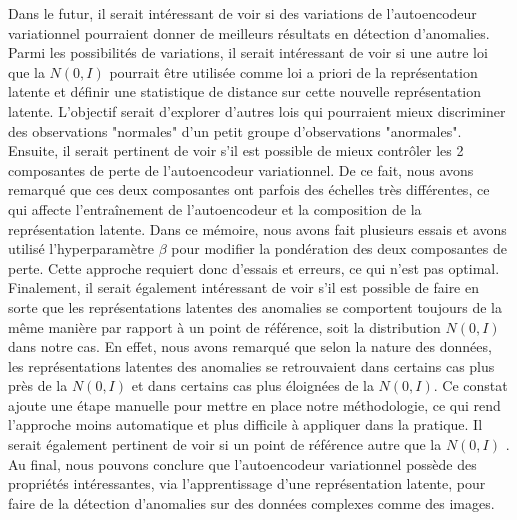Dans le futur, il serait intéressant de voir si des variations de l'autoencodeur variationnel pourraient donner de meilleurs résultats en détection d'anomalies. Parmi les possibilités de variations, il serait intéressant de voir si une autre loi que la $N(0,I)$ pourrait être utilisée comme loi a priori de la représentation latente et définir une statistique de distance sur cette nouvelle représentation latente. L'objectif serait d'explorer d'autres lois qui pourraient mieux discriminer des observations "normales" d'un petit groupe d'observations "anormales". Ensuite, il serait pertinent de voir s'il est possible de mieux contrôler les 2 composantes de perte de l'autoencodeur variationnel. De ce fait, nous avons remarqué que ces deux composantes ont parfois des échelles très différentes, ce qui affecte l'entraînement de l'autoencodeur et la composition de la représentation latente. Dans ce mémoire, nous avons fait plusieurs essais et avons utilisé l'hyperparamètre $\beta$  pour modifier la pondération des deux composantes de perte. Cette approche requiert donc \DIFdelbegin {}\DIFdelend \DIFaddbegin {}\DIFaddend d'essais et erreurs, ce qui n'est pas optimal. Finalement, il serait également intéressant de voir s'il est possible de faire en sorte que les représentations latentes des anomalies se comportent toujours de la même manière par rapport à un point de référence, soit la distribution $N(0,I)$ dans notre cas. En effet, nous avons remarqué que selon la nature des données, les représentations latentes des anomalies se retrouvaient dans certains cas plus près de la $N(0,I)$ et dans certains cas  plus éloignées de la $N(0,I)$. Ce constat ajoute une étape manuelle pour mettre en place notre méthodologie, ce qui rend l'approche moins automatique et plus difficile à appliquer dans la pratique. Il serait également pertinent de voir si un \DIFdelbegin {}\DIFdelend point de référence \DIFdelbegin \DIFdel{, }\DIFdelend autre que la $N(0,I)$ \DIFdelbegin {}\DIFdelend \DIFaddbegin {}\DIFaddend . Au final, nous pouvons conclure que l'autoencodeur variationnel possède des propriétés intéressantes, via l'apprentissage d'une représentation latente, pour faire de la détection d'anomalies sur des données complexes comme des images.


